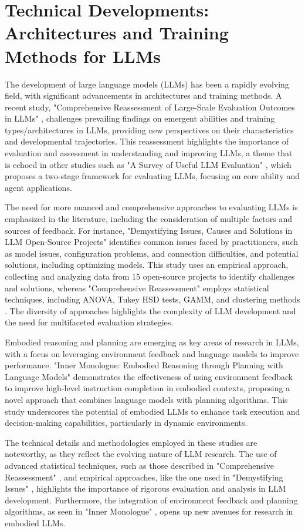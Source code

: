 \documentclass[conference]{IEEEtran}
\begin{document}
\section{Technical Developments: Architectures and Training Methods for LLMs}
The development of large language models (LLMs) has been a rapidly evolving field, with significant advancements in architectures and training methods. A recent study, "Comprehensive Reassessment of Large-Scale Evaluation Outcomes in LLMs" \cite{b1}, challenges prevailing findings on emergent abilities and training types/architectures in LLMs, providing new perspectives on their characteristics and developmental trajectories. This reassessment highlights the importance of evaluation and assessment in understanding and improving LLMs, a theme that is echoed in other studies such as "A Survey of Useful LLM Evaluation" \cite{b3}, which proposes a two-stage framework for evaluating LLMs, focusing on core ability and agent applications.

The need for more nuanced and comprehensive approaches to evaluating LLMs is emphasized in the literature, including the consideration of multiple factors and sources of feedback. For instance, "Demystifying Issues, Causes and Solutions in LLM Open-Source Projects" \cite{b2} identifies common issues faced by practitioners, such as model issues, configuration problems, and connection difficulties, and potential solutions, including optimizing models. This study uses an empirical approach, collecting and analyzing data from 15 open-source projects to identify challenges and solutions, whereas "Comprehensive Reassessment" employs statistical techniques, including ANOVA, Tukey HSD tests, GAMM, and clustering methods \cite{b1}. The diversity of approaches highlights the complexity of LLM development and the need for multifaceted evaluation strategies.

Embodied reasoning and planning are emerging as key areas of research in LLMs, with a focus on leveraging environment feedback and language models to improve performance. "Inner Monologue: Embodied Reasoning through Planning with Language Models" \cite{b4} demonstrates the effectiveness of using environment feedback to improve high-level instruction completion in embodied contexts, proposing a novel approach that combines language models with planning algorithms. This study underscores the potential of embodied LLMs to enhance task execution and decision-making capabilities, particularly in dynamic environments.

The technical details and methodologies employed in these studies are noteworthy, as they reflect the evolving nature of LLM research. The use of advanced statistical techniques, such as those described in "Comprehensive Reassessment" \cite{b1}, and empirical approaches, like the one used in "Demystifying Issues" \cite{b2}, highlights the importance of rigorous evaluation and analysis in LLM development. Furthermore, the integration of environment feedback and planning algorithms, as seen in "Inner Monologue" \cite{b4}, opens up new avenues for research in embodied LLMs.
\end{document}
